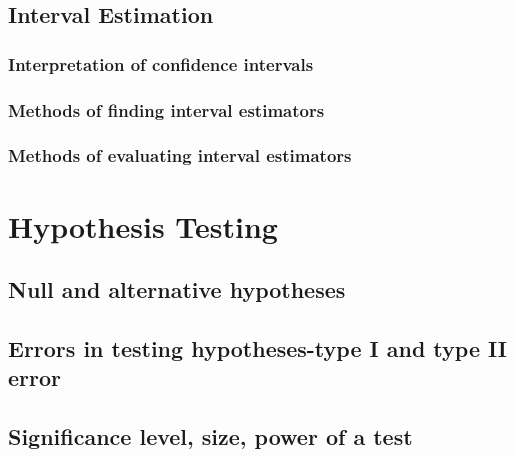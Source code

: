 \documentclass[]{book}
\begin{document}
\hypertarget{interval-estimation}{%
\section{Interval Estimation}\label{interval-estimation}}

\hypertarget{interpretation-of-confidence-intervals}{%
\subsection{Interpretation of confidence intervals}\label{interpretation-of-confidence-intervals}}

\hypertarget{methods-of-finding-interval-estimators}{%
\subsection{Methods of finding interval estimators}\label{methods-of-finding-interval-estimators}}

\hypertarget{methods-of-evaluating-interval-estimators}{%
\subsection{Methods of evaluating interval estimators}\label{methods-of-evaluating-interval-estimators}}

\hypertarget{hypothesis-testing}{%
\chapter{Hypothesis Testing}\label{hypothesis-testing}}

\hypertarget{null-and-alternative-hypotheses}{%
\section{Null and alternative hypotheses}\label{null-and-alternative-hypotheses}}

\hypertarget{errors-in-testing-hypotheses-type-i-and-type-ii-error}{%
\section{Errors in testing hypotheses-type I and type II error}\label{errors-in-testing-hypotheses-type-i-and-type-ii-error}}

\hypertarget{significance-level-size-power-of-a-test}{%
\section{Significance level, size, power of a test}\label{significance-level-size-power-of-a-test}}
\end{document}
